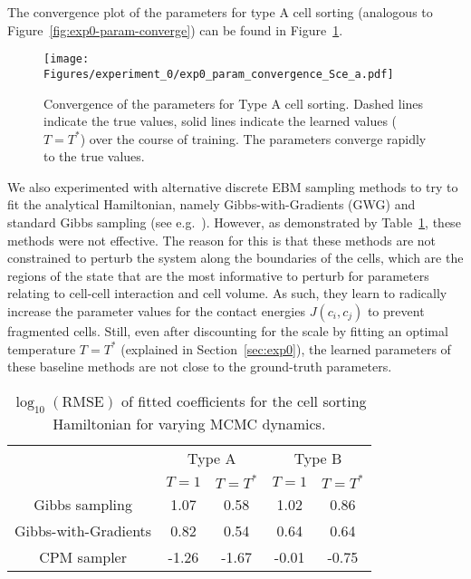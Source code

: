 The convergence plot of the parameters for type A cell sorting (analogous to Figure~\ref{fig:exp0-param-converge}) can be found in Figure~\ref{fig:app-typea-cellsort-converge}.

\begin{figure}[h]
    \centering
    \texttt{[image: Figures/experiment\_0/exp0\_param\_convergence\_Sce\_a.pdf]}    
    \caption{Convergence of the parameters for Type A cell sorting. Dashed lines indicate the true values, solid lines indicate the learned values ($T=T^*$) over the course of training. The parameters converge rapidly to the true values.}
    \label{fig:app-typea-cellsort-converge}
\end{figure}


We also experimented with alternative discrete EBM sampling methods to try to fit the analytical Hamiltonian, namely Gibbs-with-Gradients (GWG)\cite{grathwohl2021oops} and standard Gibbs sampling (see e.g.~\cite{barbu2020monte}). However, as demonstrated by Table~\ref{tab:app-exp-0-additional}, these methods were not effective. The reason for this is that these methods are not constrained to perturb the system along the boundaries of the cells, which are the regions of the state that are the most informative to perturb for parameters relating to cell-cell interaction and cell volume. As such, they learn to radically increase the parameter values for the contact energies $J(c_i,c_j)$ to prevent fragmented cells. Still, even after discounting for the scale by fitting an optimal temperature $T=T^*$ (explained in Section~\ref{sec:exp0}), the learned parameters of these baseline methods are not close to the ground-truth parameters. 

\begin{table}[h]
\centering
\small
\setlength{\tabcolsep}{3.5pt}
\caption{$\log_{10}(\text{RMSE})$ of fitted coefficients for the cell sorting Hamiltonian for varying MCMC dynamics.}\label{tab:app-exp-0-additional}
\vskip 0.15in
\begin{tabular}{ccccc}
\toprule
 & \multicolumn{2}{c}{Type A} & \multicolumn{2}{c}{Type B} \\
 & $T=1$ & $T=T^*$ & $T=1$ & $T=T^*$ \\
\midrule
Gibbs sampling & 1.07 & 0.58 & 1.02 & 0.86 \\
Gibbs-with-Gradients & 0.82 & 0.54 & 0.64 & 0.64 \\
CPM sampler & -1.26 & -1.67 & -0.01 & -0.75 \\
\bottomrule
\end{tabular}
\end{table}


